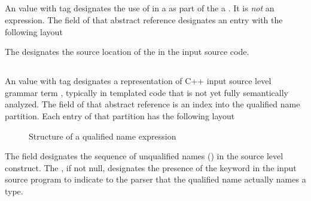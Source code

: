 


\subsection{}
\label{sec:ifc:ExprSort:Pointer}

An  value with tag  designates the use of \code{*} in a 
 as part of the a .  It is \emph{not} an expression.
The  field of that abstract reference designates an entry with the following layout
%
\begin{figure}[H]
	\centering
	\label{fig:ifc-pointer-expr-structure}
\end{figure}
%
The  designates the source location of the \code{*} in the input source code.



\subsection{}
\label{sec:ifc:ExprSort:QualifiedName}

An  value with tag  designates a representation of 
C++ input source level grammar term , typically in templated code that is not
yet fully semantically analyzed.  The  field of that abstract reference is an index into
the qualified name partition.  Each entry of that partition has the following layout
%
\begin{figure}[H]
	\centering
	\caption{Structure of a qualified name expression}
	\label{fig:ifc-qualified-name-structure}
\end{figure}
%
The  field designates the sequence of unqualified names ()
 in the source level construct.  The , if not null, designates the presence of
 the  keyword in the input source program to indicate to the parser that the qualified name actually names a type.

